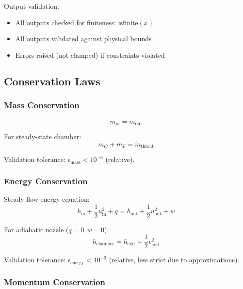 \documentclass[12pt,a4paper]{article}
\newcommand{\mdot}{\dot{m}}
\begin{document}
Output validation:
\begin{itemize}
    \item All outputs checked for finiteness: $\text{isfinite}(x)$
    \item All outputs validated against physical bounds
    \item Errors raised (not clamped) if constraints violated
\end{itemize}

\subsection{Conservation Laws}

\subsubsection{Mass Conservation}

\begin{equation}
\mdot_{\text{in}} = \mdot_{\text{out}}
\end{equation}

For steady-state chamber:
\begin{equation}
\mdot_O + \mdot_F = \mdot_{\text{throat}}
\end{equation}

Validation tolerance: $\epsilon_{\text{mass}} < 10^{-6}$ (relative).

\subsubsection{Energy Conservation}

Steady-flow energy equation:
\begin{equation}
h_{\text{in}} + \frac{1}{2} u_{\text{in}}^2 + q = h_{\text{out}} + \frac{1}{2} u_{\text{out}}^2 + w
\end{equation}

For adiabatic nozzle ($q = 0, w = 0$):
\begin{equation}
h_{\text{chamber}} = h_{\text{exit}} + \frac{1}{2} v_{\text{exit}}^2
\end{equation}

Validation tolerance: $\epsilon_{\text{energy}} < 10^{-3}$ (relative, less strict due to approximations).

\subsubsection{Momentum Conservation}
\end{document}
